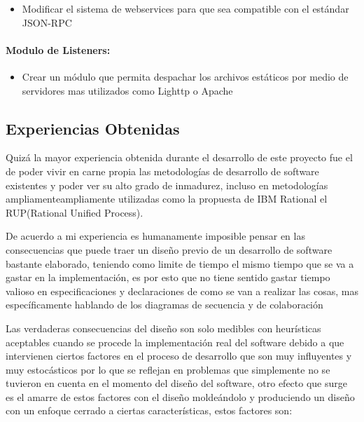 \begin{itemize}
	\item Modificar el sistema de webservices para que sea compatible con el estándar JSON-RPC \cite{json-rpc}
\end{itemize}

\paragraph{Modulo de Listeners:}

\begin{itemize}
	\item Crear un módulo que permita despachar los archivos estáticos por medio de servidores mas utilizados como Lighttp \cite{lighttp} o Apache \cite{apache}
\end{itemize}


\subsection{Experiencias Obtenidas}

Quizá la mayor experiencia obtenida durante el desarrollo de este proyecto fue el de poder vivir en carne propia las metodologías de desarrollo de software existentes y poder ver su alto grado de inmadurez, incluso en metodologías ampliamenteampliamente utilizadas como la propuesta de IBM Rational el RUP(Rational Unified Process).

De acuerdo a mi experiencia es humanamente imposible pensar en las consecuencias que puede traer un diseño previo de un desarrollo de software bastante elaborado, teniendo como limite de tiempo el mismo tiempo que se va a gastar en la implementación, es por esto que no tiene sentido gastar tiempo valioso en especificaciones y declaraciones de como se van a realizar las cosas, mas específicamente hablando de los diagramas de secuencia y de colaboración

Las verdaderas consecuencias del diseño son solo medibles con heurísticas aceptables cuando se procede la implementación real del software debido a que intervienen ciertos factores en el proceso de desarrollo que son muy influyentes y muy estocásticos por lo que se reflejan en problemas que simplemente no se tuvieron en cuenta en el momento del diseño del software, otro efecto que surge es el amarre de estos factores con el diseño moldeándolo y produciendo un diseño con un enfoque cerrado a ciertas características, estos factores son:

